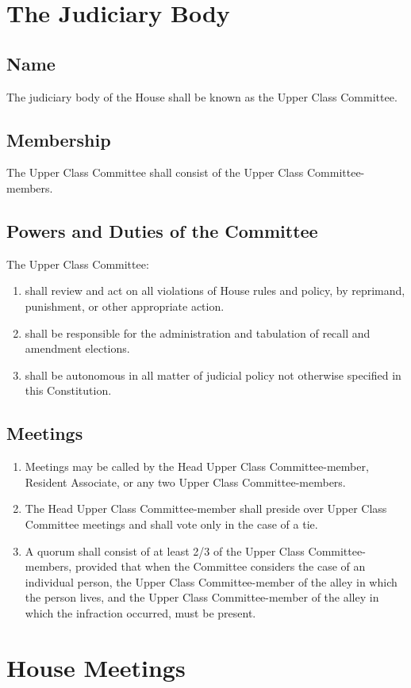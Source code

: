 \documentclass[10pt]{article} %
\begin{document}
\section{The Judiciary Body}
\subsection{Name}
The judiciary body of the House shall be known as the Upper Class Committee.
\subsection{Membership}
The Upper Class Committee shall consist of the Upper Class Committee-members.
\subsection{Powers and Duties of the Committee}
The Upper Class Committee:
\begin{enumerate}
\item shall review and act on all violations of House rules and policy, by reprimand, punishment, or other appropriate action.
\item shall be responsible for the administration and tabulation of recall and amendment elections.
\item shall be autonomous in all matter of judicial policy not otherwise specified in this Constitution.
\end{enumerate}
\subsection{Meetings}
\begin{enumerate}
\item Meetings may be called by the Head Upper Class Committee-member, Resident Associate, or any two Upper Class Committee-members.
\item The Head Upper Class Committee-member shall preside over Upper Class Committee meetings and shall vote only in the case of a tie.
\item A quorum shall consist of at least 2/3 of the Upper Class Committee-members, provided that when the Committee considers the case of an individual person, the Upper Class Committee-member of the alley in which the person lives, and the Upper Class Committee-member of the alley in which the infraction occurred, must be present.
\end{enumerate}
\section{House Meetings}
\end{document}
